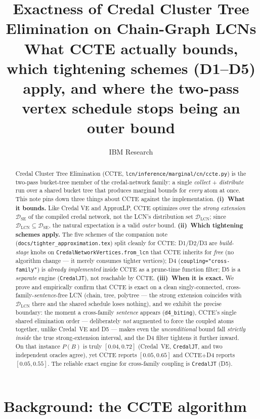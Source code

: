 \documentclass[11pt]{article}
\title{Exactness of Credal Cluster Tree Elimination on Chain-Graph LCNs\\
\large What CCTE actually bounds, which tightening schemes (D1--D5) apply, and
where the two-pass vertex schedule stops being an outer bound}
\author{IBM Research}
\date{}
\newcommand{\DSE}{\mathcal{D}_{\mathrm{SE}}}
\newcommand{\DLCN}{\mathcal{D}_{\mathrm{LCN}}}
\begin{document}
\maketitle

\begin{abstract}
Credal Cluster Tree Elimination (CCTE, \texttt{lcn/inference/marginal/cn/ccte.py}) is the
two-pass bucket-tree member of the credal-network family: a single \emph{collect} +
\emph{distribute} run over a shared bucket tree that produces marginal bounds for
\emph{every} atom at once. This note pins down three things about CCTE against the
implementation. \textbf{(i)~What it bounds.} Like Credal VE and ApproxLP, CCTE optimizes over
the \emph{strong extension} $\DSE$ of the compiled credal network, not the LCN's distribution
set $\DLCN$; since $\DLCN\subseteq\DSE$, the natural expectation is a valid \emph{outer}
bound. \textbf{(ii)~Which tightening schemes apply.} The five schemes of the companion note
(\texttt{docs/tighter\_approximation.tex}) split cleanly for CCTE: D1/D2/D3 are
\emph{build-stage} knobs on \texttt{CredalNetworkVertices.from\_lcn} that CCTE inherits for
\emph{free} (no algorithm change --- it merely consumes tighter vertices); D4
(\texttt{coupling="cross-family"}) is \emph{already implemented} inside CCTE as a
prune-time function filter; D5 is a \emph{separate} engine (\texttt{CredalJT}), not reachable
by CCTE. \textbf{(iii)~When it is exact.} We prove and empirically confirm that CCTE is exact
on a clean singly-connected, cross-family-\emph{sentence}-free LCN (chain, tree, polytree ---
the strong extension coincides with $\DLCN$ there and the shared schedule loses nothing), and
we exhibit the precise boundary: the moment a cross-family \emph{sentence} appears
(\texttt{d4\_biting}), CCTE's single shared elimination order --- deliberately \emph{not}
augmented to force the coupled atoms together, unlike Credal~VE and D5 --- makes even the
\emph{unconditional} bound fall \emph{strictly inside} the true strong-extension interval, and
the D4 filter tightens it further inward. On that instance $P(B)$ is truly $[0.04,0.72]$
(Credal~VE, \texttt{CredalJT}, and two independent oracles agree), yet CCTE reports
$[0.05,0.65]$ and CCTE${+}$D4 reports $[0.05,0.55]$. The reliable exact engine for cross-family
coupling is \texttt{CredalJT} (D5).
\end{abstract}

\tableofcontents

\section{Background: the CCTE algorithm}\label{sec:bg}
\end{document}
